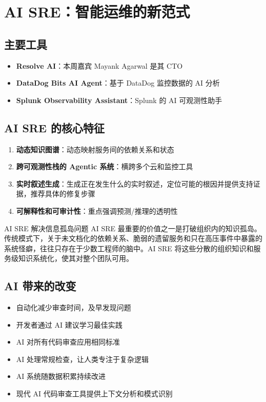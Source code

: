 \section{AI SRE：智能运维的新范式}

\subsection{主要工具}

\begin{itemize}
    \item \textbf{Resolve AI}：本周嘉宾 Mayank Agarwal 是其 CTO
    \item \textbf{DataDog Bits AI Agent}：基于 DataDog 监控数据的 AI 分析
    \item \textbf{Splunk Observability Assistant}：Splunk 的 AI 可观测性助手
\end{itemize}

\subsection{AI SRE 的核心特征}

\begin{enumerate}
    \item \textbf{动态知识图谱}：动态映射服务间的依赖关系和状态
    \item \textbf{跨可观测性栈的 Agentic 系统}：横跨多个云和监控工具
    \item \textbf{实时叙述生成}：生成正在发生什么的实时叙述，定位可能的根因并提供支持证据，推荐具体的修复步骤
    \item \textbf{可解释性和可审计性}：重点强调预测/推理的透明性
\end{enumerate}

\begin{knowledgebox}{AI SRE 解决信息孤岛问题}
AI SRE 最重要的价值之一是打破组织内的知识孤岛。传统模式下，关于未文档化的依赖关系、脆弱的遗留服务和只在高压事件中暴露的系统怪癖，往往只存在于少数工程师的脑中。AI SRE 将这些分散的组织知识和服务级知识系统化，使其对整个团队可用。
\end{knowledgebox}

\subsection{AI 带来的改变}

\begin{itemize}
    \item 自动化减少审查时间，及早发现问题
    \item 开发者通过 AI 建议学习最佳实践
    \item AI 对所有代码审查应用相同标准
    \item AI 处理常规检查，让人类专注于复杂逻辑
    \item AI 系统随数据积累持续改进
    \item 现代 AI 代码审查工具提供上下文分析和模式识别
\end{itemize}

